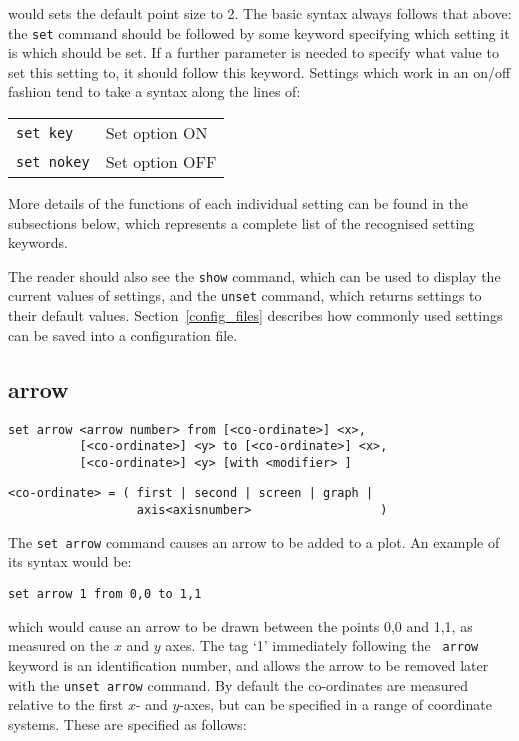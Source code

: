 \noindent would sets the default point size to 2. The basic syntax always
follows that above: the {\tt set} command should be followed by some keyword
specifying which setting it is which should be set. If a further parameter is
needed to specify what value to set this setting to, it should follow this
keyword. Settings which work in an on/off fashion tend to take a syntax along
the lines of:

\begin{tabular}{ll}
{\tt set key} & Set option ON \\
{\tt set nokey} & Set option OFF
\end{tabular}

More details of the functions of each individual setting can be found in the
subsections below, which represents a complete list of the recognised setting
keywords.

The reader should also see the {\tt show} command, which can be used to display
the current values of settings, and the {\tt unset} command, which returns
settings to their default values. Section~\ref{config_files} describes how
commonly used settings can be saved into a configuration file.

\subsection{arrow}

\begin{verbatim}
set arrow <arrow number> from [<co-ordinate>] <x>,
          [<co-ordinate>] <y> to [<co-ordinate>] <x>,
          [<co-ordinate>] <y> [with <modifier> ]
\end{verbatim}

\begin{verbatim}
<co-ordinate> = ( first | second | screen | graph |
                  axis<axisnumber>                  )
\end{verbatim}

The {\tt set arrow} command causes an arrow to be added to a plot. An example of
its syntax would be:

\begin{verbatim}
set arrow 1 from 0,0 to 1,1
\end{verbatim}

\noindent which would cause an arrow to be drawn between the points 0,0 and 1,1, as
measured on the $x$ and $y$ axes.  The tag `1' immediately following the {\tt
arrow} keyword is an identification number, and allows the arrow to be removed
later with the {\tt unset arrow} command.  By default the co-ordinates are
measured relative to the first $x$- and $y$-axes, but can be specified in a range
of coordinate systems. These are specified as follows:

